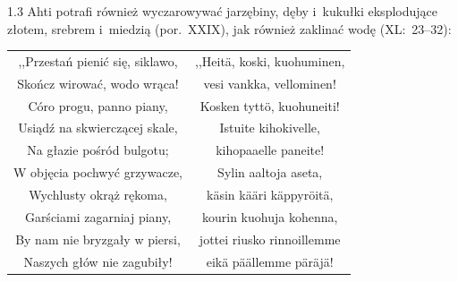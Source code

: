 \documentclass[11pt,a4paper,twoside]{report}
\begin{document}
\begin{spacing}{1.3}
Ahti potrafi również wyczarowywać jarzębiny, dęby i~kukułki eksplodujące złotem, srebrem i~miedzią (por.~XXIX), jak również zaklinać wodę (XL:~23--32):
\end{spacing}
{\centering
\small
\begin{longtable}{c c}
,,Przestań pienić się, siklawo, & ,,Heitä, koski, kuohuminen, \\
Skończ wirować, wodo wrąca! & vesi vankka, vellominen! \\
Córo progu, panno piany, & Kosken tyttö, kuohuneiti! \\
Usiądź na skwierczącej skale, & Istuite kihokivelle, \\
Na głazie pośród bulgotu; & kihopaaelle paneite! \\ \newpage
W objęcia pochwyć grzywacze, & Sylin aaltoja aseta, \\
Wychlusty okrąż rękoma, & käsin kääri käppyröitä, \\
Garściami zagarniaj piany, & kourin kuohuja kohenna, \\
By nam nie bryzgały w piersi, & jottei riusko rinnoillemme \\
Naszych głów nie zagubiły! & eikä päällemme päräjä! \\
\end{longtable}
}
\vspace*{0.5\baselineskip}
\end{document}
